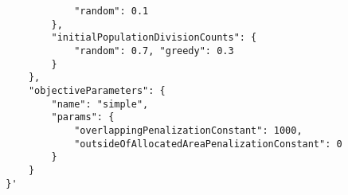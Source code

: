 \begin{listing}[h!]
\begin{verbatim}
                    "random": 0.1
                },
                "initialPopulationDivisionCounts": {
                    "random": 0.7, "greedy": 0.3
                }
            },
            "objectiveParameters": {
                "name": "simple",
                "params": {
                    "overlappingPenalizationConstant": 1000,
                    "outsideOfAllocatedAreaPenalizationConstant": 0
                }
            }
        }'
    \end{verbatim}
    \cprotect\caption[Example of computation submission without instance name]
    {Example of computation submission using \verb|curl|\footnote{\url{https://curl.se/}} without specifying the instance name.
    Without it, everything has to be entered manually into the request – layout width and height, paintings together with their flow, and evaluation function.
    }

    \label{lst:computation-submission-manual}
\end{listing}
